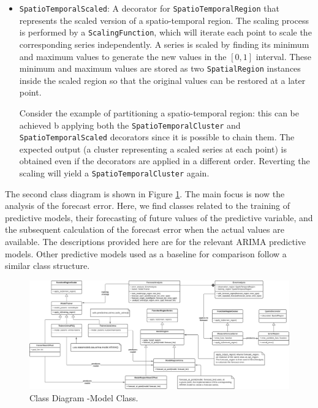 \begin{itemize}
	\item \texttt{SpatioTemporalScaled}: A decorator for \texttt{SpatioTemporalRegion} that represents the scaled version of a spatio-temporal region. The scaling process is performed by a \texttt{ScalingFunction}, which will iterate each point to scale the corresponding series independently. A series is scaled by finding its minimum and maximum values to generate the new values in the $[0, 1]$ interval. These minimum and maximum values are stored as two \texttt{SpatialRegion} instances inside the scaled region so that the original values can be restored at a later point. 
	
	Consider the example of partitioning a spatio-temporal region: this can be achieved b applying both the \texttt{SpatioTemporalCluster} and \texttt{SpatioTemporalScaled} decorators since it is possible to chain them. The expected output (a cluster representing a scaled series at each point) is obtained even if the decorators are applied in a different order. Reverting the scaling will yield a \texttt{SpatioTemporalCluster} again.
\end{itemize}

The second class diagram is shown in Figure \ref{Fig:DiagramClasess-Models}. The main focus is now the analysis of the forecast error. Here, we find classes related to the training of predictive models, their forecasting of future values of the predictive variable, and the subsequent calculation of the forecast error when the actual values are available. The descriptions provided here are for the relevant ARIMA predictive models. Other predictive models used as a baseline for comparison follow a similar class structure.

\begin{figure}[tp]
	\centering
	\includegraphics[scale=0.37, angle=90]{../Figures/SPT-TSA-ModelsClasses}
	\caption{Class Diagram -Model Class.}	
	\label{Fig:DiagramClasess-Models}	 		
\end{figure}


